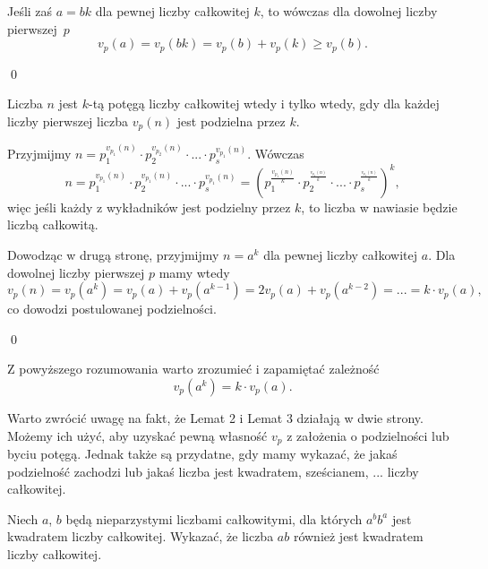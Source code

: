 \vspace{5px}

\noindent
Jeśli zaś $a = bk$ dla pewnej liczby całkowitej $k$, to wówczas dla dowolnej liczby pierwszej~$p$
\[
	v_p(a) = v_p(bk) = v_p(b) + v_p(k) \geqslant v_p(b).
\]

\qed


\noindent
Liczba $n$ jest $k$-tą potęgą liczby całkowitej wtedy i tylko wtedy, gdy dla każdej liczby pierwszej liczba $v_p(n)$ jest podzielna przez $k$. 

\vspace{5px}


\noindent
Przyjmijmy 
$ n = p_1^{v_{p_1}(n)} \cdot p_2^{v_{p_2}(n)} \cdot ... \cdot p_s^{v_{p_1}(n)}. $
Wówczas
\[
	n = p_1^{v_{p_1}(n)} \cdot p_2^{v_{p_1}(n)} \cdot ... \cdot p_s^{v_{p_1}(n)} = \left( p_1^{\frac{v_{p_1}(n)}{k}} \cdot p_2^{^{\frac{v_{p_2}(n)}{k}}} \cdot ... \cdot p_s^{^{\frac{v_{p_s}(n)}{k}}}\right)^k,
\]
więc jeśli każdy z wykładników jest podzielny przez $k$, to liczba w nawiasie będzie liczbą całkowitą.

\vspace{10px}

\noindent
Dowodząc w drugą stronę, przyjmijmy $n = a^k$ dla pewnej liczby całkowitej $a$. Dla dowolnej liczby pierwszej $p$ mamy wtedy
\[
	v_p(n) = v_p(a^k) = v_p(a) + v_p(a^{k - 1}) = 2v_p(a) + v_p(a^{k - 2}) = ... =  k \cdot v_p(a),
\]
co dowodzi postulowanej podzielności.

\qed

\vspace{10px}

\noindent
Z powyższego rozumowania warto zrozumieć i zapamiętać zależność
\[
	v_p(a^k) =  k \cdot v_p(a).
\]


\noindent
Warto zwrócić uwagę na fakt, że Lemat 2 i Lemat 3 działają w dwie strony. Możemy ich użyć, aby uzyskać pewną własność $v_p$ z założenia o podzielności lub byciu potęgą. Jednak także są przydatne, gdy mamy wykazać, że jakaś podzielność zachodzi lub jakaś liczba jest kwadratem, sześcianem, ... liczby całkowitej.

\vspace{10px}



\noindent
Niech $a$, $b$ będą nieparzystymi liczbami całkowitymi, dla których $a^bb^a$ jest kwadratem liczby całkowitej. Wykazać, że liczba $ab$ również jest kwadratem liczby całkowitej.

